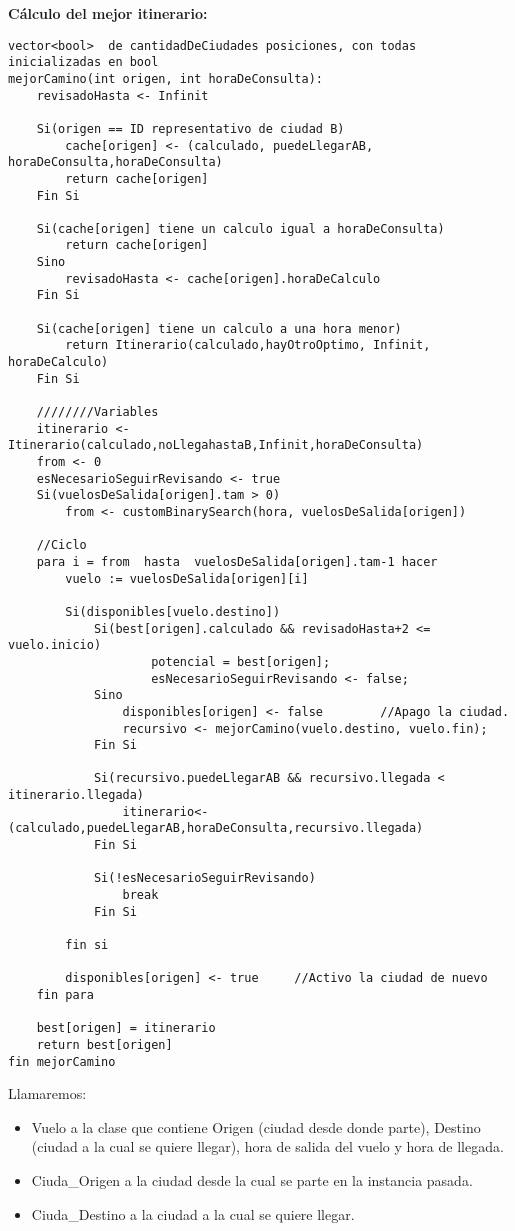 \textbf{Cálculo del mejor itinerario:}\\

\begin{lstlisting}
vector<bool>  de cantidadDeCiudades posiciones, con todas inicializadas en bool
mejorCamino(int origen, int horaDeConsulta):
	revisadoHasta <- Infinit	
	
	Si(origen == ID representativo de ciudad B)
		cache[origen] <- (calculado, puedeLlegarAB, horaDeConsulta,horaDeConsulta)
		return cache[origen]
	Fin Si
	
	Si(cache[origen] tiene un calculo igual a horaDeConsulta)
		return cache[origen]	
	Sino
		revisadoHasta <- cache[origen].horaDeCalculo
	Fin Si
	
	Si(cache[origen] tiene un calculo a una hora menor)
	 	return Itinerario(calculado,hayOtroOptimo, Infinit, horaDeCalculo)
	Fin Si
	
	////////Variables
	itinerario <- Itinerario(calculado,noLlegahastaB,Infinit,horaDeConsulta)
	from <- 0
	esNecesarioSeguirRevisando <- true
	Si(vuelosDeSalida[origen].tam > 0)
		from <- customBinarySearch(hora, vuelosDeSalida[origen])
	
	//Ciclo
	para i = from  hasta  vuelosDeSalida[origen].tam-1 hacer
		vuelo := vuelosDeSalida[origen][i]

		Si(disponibles[vuelo.destino])
			Si(best[origen].calculado && revisadoHasta+2 <= vuelo.inicio)
					potencial = best[origen];
					esNecesarioSeguirRevisando <- false;
			Sino			
				disponibles[origen] <- false		//Apago la ciudad.
				recursivo <- mejorCamino(vuelo.destino, vuelo.fin);
			Fin Si
			
			Si(recursivo.puedeLlegarAB && recursivo.llegada < itinerario.llegada)
				itinerario<-(calculado,puedeLlegarAB,horaDeConsulta,recursivo.llegada)
			Fin Si
			
			Si(!esNecesarioSeguirRevisando)
				break
			Fin Si
			
		fin si
		
		disponibles[origen] <- true		//Activo la ciudad de nuevo
	fin para
	
	best[origen] = itinerario
	return best[origen]
fin mejorCamino 
\end{lstlisting}
\newpage

Llamaremos:
\begin{itemize}
\item Vuelo a la clase que contiene Origen (ciudad desde donde parte), Destino (ciudad a la cual se quiere llegar), hora de salida del vuelo y hora de llegada.
\item Ciuda\_Origen a la ciudad desde la cual se parte en la instancia pasada.
\item Ciuda\_Destino a la ciudad a la cual se quiere llegar.\\
\end{itemize}

